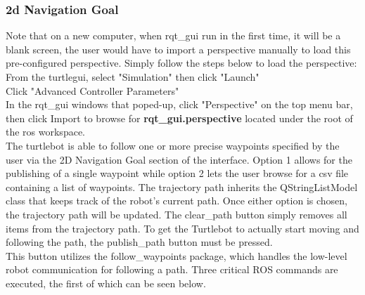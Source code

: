 \documentclass[12]{article}
\begin{document}
\subsubsection{2d Navigation Goal}

Note that on a new computer, when rqt\_gui run in the first time, it will be a blank screen, 
the user would have to import a perspective manually to load this pre-configured perspective.
Simply follow the steps below to load the perspective: \\
From the turtlegui, select "Simulation" then click "Launch"\\
Click "Advanced Controller Parameters"\\
In the rqt\_gui windows that poped-up, click "Perspective" on the top menu bar, 
then click Import to browse for \textbf{rqt\_gui.perspective} located under the root of the ros workspace. \\


The turtlebot is able to follow one or more precise waypoints specified by the user via the 2D Navigation Goal section of the interface. 
Option 1 allows for the publishing of a single waypoint while option 2 lets the user browse for a csv file containing a list of waypoints. 
The trajectory path inherits the QStringListModel class that keeps track of the robot's current path. 
Once either option is chosen, the trajectory path will be updated. 
The clear\_path button simply removes all items from the trajectory path. 
To get the Turtlebot to actually start moving and following the path, the publish\_path button must be pressed.\\ 

This button utilizes the follow\_waypoints package, which handles the low-level robot communication for following a path. 
Three critical ROS commands are executed, the first of which can be seen below.


\end{document}
